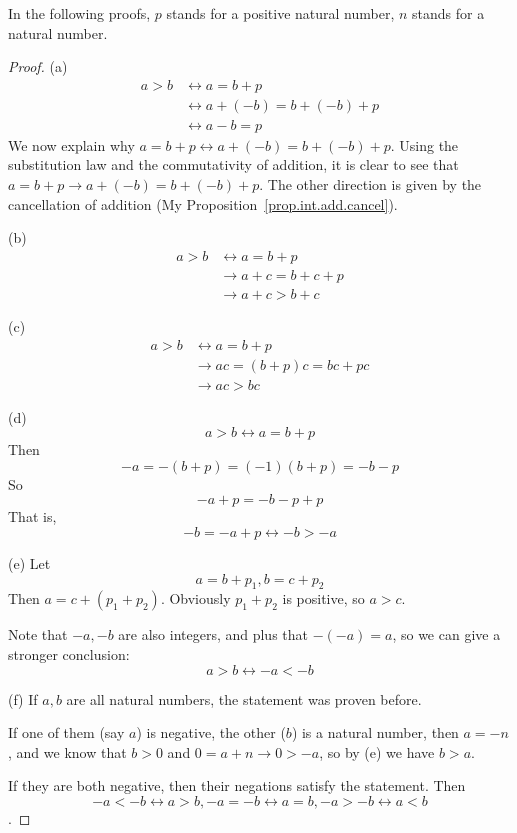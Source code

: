 In the following proofs, $p$ stands for a positive natural number, $n$ stands
for a natural number.

\begin{proof}
(a)
\begin{align*}
a>b 
&\leftrightarrow a = b+p \\
&\leftrightarrow a+(-b) = b + (-b) + p  \tag{See the following explanation} \\
&\leftrightarrow a-b = p
\end{align*}
We now explain why $a = b+p \leftrightarrow a+(-b) = b + (-b) + p$. Using the
substitution law and the commutativity of addition, it is clear to see that $a =
b+p \rightarrow a+(-b) = b + (-b) + p$. The other direction is given by the
cancellation of addition (My Proposition~\ref{prop.int.add.cancel}).

(b)
\begin{align*}
a>b
&\leftrightarrow a = b + p \\
&\rightarrow a+c = b+c+p \\
&\rightarrow a+c>b+c
\end{align*}

(c)
\begin{align*}
a>b
&\leftrightarrow a=b+p \\
&\rightarrow ac = (b+p)c = bc + pc \\
&\rightarrow ac > bc \tag{$pc > 0$ by Lemma 2.3.3}
\end{align*}

(d)
\[
a>b \leftrightarrow a = b+p
\]
Then
\[
-a = -(b+p) = (-1)(b+p) = -b - p
\]
So
\[
-a+p=-b-p+p
\]
That is,
\[
-b=-a+p \leftrightarrow -b>-a
\]

(e)
Let
\[
a = b+p_1,b=c+p_2
\]
Then $a = c+(p_1+p_2)$. Obviously $p_1+p_2$ is positive, so $a>c$.

Note that $-a,-b$ are also integers, and plus that $-(-a)=a$, so we can give a
stronger conclusion:
\[
a>b \leftrightarrow -a<-b
\]

(f)
If $a,b$ are all natural numbers, the statement was proven before. 

If one of them (say $a$) is negative, 
the other ($b$) is a natural number, then $a=-n$, and we know that $b>0$ and 
$0 = a+n \rightarrow 0 >-a$, so by (e) we have $b>a$.

If they are both negative, then their negations satisfy the statement. Then
\[
-a<-b \leftrightarrow a>b, -a=-b \leftrightarrow a=b, -a>-b \leftrightarrow a<b
\].
\end{proof}

